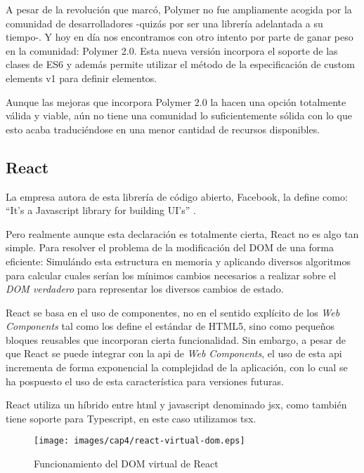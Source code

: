 \bigskip
A pesar de la revolución que marcó, Polymer no fue ampliamente acogida por la comunidad de desarrolladores 
-quizás por ser una librería adelantada a su tiempo-. Y hoy en día nos encontramos con otro intento por 
parte de ganar peso en la comunidad: Polymer 2.0. Esta nueva versión incorpora el soporte de las clases de ES6
y además permite utilizar el método de la especificación de custom elements v1 para definir elementos.

\bigskip
Aunque las mejoras que incorpora Polymer 2.0 la hacen una opción totalmente válida y viable, aún no 
tiene una comunidad lo suficientemente sólida con lo que esto acaba traduciéndose en una menor 
cantidad de recursos disponibles.

\subsection{React}
La empresa autora de esta librería de código abierto, Facebook, la define como: “It’s a Javascript library for building UI’s” \cite{React}. 

\bigskip
Pero realmente aunque esta declaración es totalmente cierta, React no es algo tan simple. Para resolver el problema
 de la modificación del DOM de una forma eficiente: Simulándo esta estructura en memoria y aplicando diversos
 algoritmos para calcular cuales serían los mínimos cambios necesarios a realizar sobre el \textit{DOM verdadero}
 para representar los diversos cambios de estado.

\bigskip
React se basa en el uso de componentes, no en el sentido explícito de los \textit{Web Components} tal como los define 
el estándar de HTML5, sino como pequeños bloques reusables que incorporan cierta funcionalidad. Sin embargo, a pesar 
de que React se puede integrar con la api de \textit{Web Components}, el uso de esta api incrementa de forma exponencial
la complejidad de la aplicación, con lo cual se ha pospuesto el uso de esta característica para versiones futuras.


\bigskip
React utiliza un híbrido entre html y javascript denominado jsx, como también tiene soporte para 
Typescript, en este caso utilizamos tsx.

\begin{figure}[!th]
\begin{center}
\texttt{[image: images/cap4/react-virtual-dom.eps]}
\caption[Funcionamiento del DOM virtual de React]{Funcionamiento del DOM virtual de React \protect\cite{ReactVirtualDOM}}
\label{fig:Funcionamiento del DOM virtual de React}
\end{center}
\end{figure}

